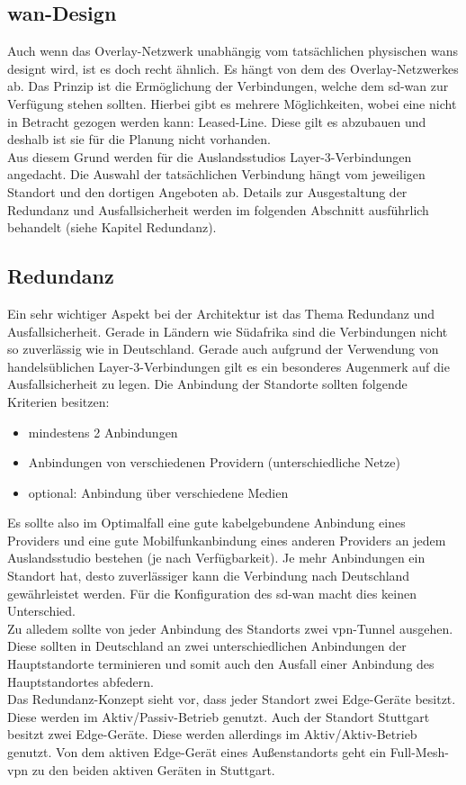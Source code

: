 \subsection*{\ac{wan}-Design}
Auch wenn das Overlay-Netzwerk unabhängig vom tatsächlichen physischen \acp{wan} designt wird, ist es doch recht ähnlich. Es hängt von dem des Overlay-Netzwerkes ab. Das Prinzip ist die Ermöglichung der Verbindungen, welche dem \ac{sd-wan} zur Verfügung stehen sollten. Hierbei gibt es mehrere Möglichkeiten, wobei eine nicht in Betracht gezogen werden kann: Leased-Line. Diese gilt es abzubauen und deshalb ist sie für die Planung nicht vorhanden. \\
Aus diesem Grund werden für die Auslandsstudios Layer-3-Verbindungen angedacht. Die Auswahl der tatsächlichen Verbindung hängt vom jeweiligen Standort und den dortigen Angeboten ab. Details zur Ausgestaltung der Redundanz und Ausfallsicherheit werden im folgenden Abschnitt ausführlich behandelt (siehe Kapitel Redundanz).

\subsection*{Redundanz}
Ein sehr wichtiger Aspekt bei der Architektur ist das Thema Redundanz und Ausfallsicherheit. Gerade in Ländern wie Südafrika sind die Verbindungen nicht so zuverlässig wie in Deutschland. Gerade auch aufgrund der Verwendung von handelsüblichen Layer-3-Verbindungen gilt es ein besonderes Augenmerk auf die Ausfallsicherheit zu legen. Die Anbindung der Standorte sollten folgende Kriterien besitzen:
\begin{itemize}
	\item mindestens 2 Anbindungen
	\item Anbindungen von verschiedenen Providern (unterschiedliche Netze)
	\item optional: Anbindung über verschiedene Medien
\end{itemize}
Es sollte also im Optimalfall eine gute kabelgebundene Anbindung eines Providers und eine gute Mobilfunkanbindung eines anderen Providers an jedem Auslandsstudio bestehen (je nach Verfügbarkeit). Je mehr Anbindungen ein Standort hat, desto zuverlässiger kann die Verbindung nach Deutschland gewährleistet werden. Für die Konfiguration des \ac{sd-wan} macht dies keinen Unterschied. \\
Zu alledem sollte von jeder Anbindung des Standorts zwei \ac{vpn}-Tunnel ausgehen. Diese sollten in Deutschland an zwei unterschiedlichen Anbindungen der Hauptstandorte terminieren und somit auch den Ausfall einer Anbindung des Hauptstandortes abfedern.\\
Das Redundanz-Konzept sieht vor, dass jeder Standort zwei Edge-Geräte besitzt. Diese werden im Aktiv/Passiv-Betrieb genutzt. Auch der Standort Stuttgart besitzt zwei Edge-Geräte. Diese werden allerdings im Aktiv/Aktiv-Betrieb genutzt. Von dem aktiven Edge-Gerät eines Außenstandorts geht ein Full-Mesh-\ac{vpn} zu den beiden aktiven Geräten in Stuttgart.